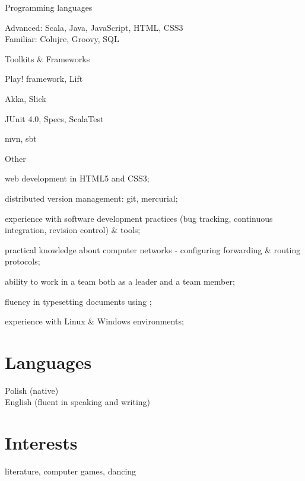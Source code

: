 \documentclass[a4paper,pdftex]{article}
\renewenvironment{itemize}{
  \begin{list}{}{
    \setlength{\leftmargin}{1.5em}
  }
}{
  \end{list}
}
\begin{document}
\begin{itemize}
 \item Programming languages
  \begin{itemize}
   \item Advanced: Scala, Java, JavaScript, HTML, CSS3 \\
         Familiar: Colujre, Groovy, SQL
  \end{itemize}
 \item Toolkits \& Frameworks
  \begin{itemize}
   \item Play! framework, Lift
   \item Akka, Slick
   \item JUnit 4.0, Specs, ScalaTest
   \item mvn, sbt
  \end{itemize}
 \item Other
  \begin{itemize}
   \setlength{\itemsep}{-0.3ex}
	\item web development in HTML5 and CSS3;
	\item distributed version management: git, mercurial;
	\item experience with software development practices (bug tracking, continuous integration, revision control) \& tools;
	\item practical knowledge about computer networks - configuring forwarding \& routing protocols;
	\item ability to work in a team both as a leader and a team member;
	\item fluency in typesetting documents using \LaTeXe;
	\item experience with Linux \& Windows environments;
  \end{itemize}
\end{itemize}

\section*{Languages}
\begin{itemize}
 \item Polish (native) \\
       English (fluent in speaking and writing)
\end{itemize}

\section*{Interests}
\begin{itemize}
 \item literature, computer games, dancing
\end{itemize}
\end{document}
